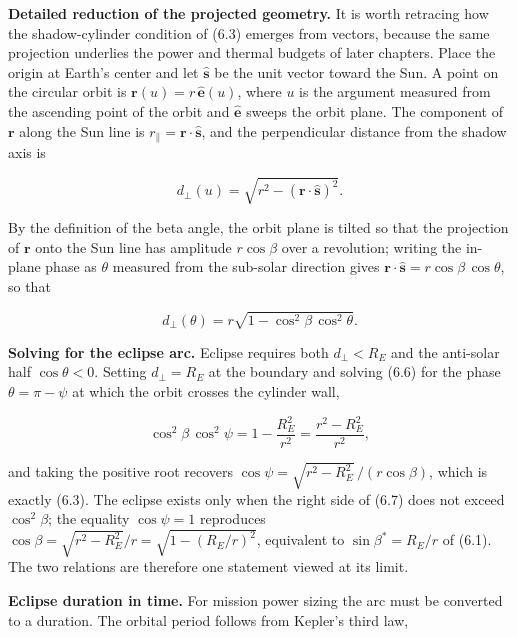 \documentclass[
  11pt,
  openany,
  oneside]{book}
\begin{document}
\textbf{Detailed reduction of the projected geometry.} It is worth
retracing how the shadow-cylinder condition of (6.3) emerges from
vectors, because the same projection underlies the power and thermal
budgets of later chapters. Place the origin at Earth's center and let
\(\hat{\mathbf{s}}\) be the unit vector toward the Sun. A point on the
circular orbit is \(\mathbf{r}(u) = r\,\hat{\mathbf{e}}(u)\), where
\(u\) is the argument measured from the ascending point of the orbit and
\(\hat{\mathbf{e}}\) sweeps the orbit plane. The component of
\(\mathbf{r}\) along the Sun line is
\(r_\parallel = \mathbf{r}\cdot\hat{\mathbf{s}}\), and the perpendicular
distance from the shadow axis is

\begin{equation}
d_\perp(u) = \sqrt{r^2 - (\mathbf{r}\cdot\hat{\mathbf{s}})^2}. \tag{6.5}
\end{equation}

By the definition of the beta angle, the orbit plane is tilted so that
the projection of \(\mathbf{r}\) onto the Sun line has amplitude
\(r\cos\beta\) over a revolution; writing the in-plane phase as
\(\theta\) measured from the sub-solar direction gives
\(\mathbf{r}\cdot\hat{\mathbf{s}} = r\cos\beta\,\cos\theta\), so that

\begin{equation}
d_\perp(\theta) = r\sqrt{1 - \cos^2\beta\,\cos^2\theta}. \tag{6.6}
\end{equation}

\textbf{Solving for the eclipse arc.} Eclipse requires both
\(d_\perp < R_E\) and the anti-solar half \(\cos\theta < 0\). Setting
\(d_\perp = R_E\) at the boundary and solving (6.6) for the phase
\(\theta = \pi - \psi\) at which the orbit crosses the cylinder wall,

\begin{equation}
\cos^2\beta\,\cos^2\psi = 1 - \frac{R_E^2}{r^2} = \frac{r^2 - R_E^2}{r^2}, \tag{6.7}
\end{equation}

and taking the positive root recovers
\(\cos\psi = \sqrt{r^2 - R_E^2}\,/(r\cos\beta)\), which is exactly
(6.3). The eclipse exists only when the right side of (6.7) does not
exceed \(\cos^2\beta\); the equality \(\cos\psi = 1\) reproduces
\(\cos\beta = \sqrt{r^2 - R_E^2}/r = \sqrt{1 - (R_E/r)^2}\), equivalent
to \(\sin\beta^\ast = R_E/r\) of (6.1). The two relations are therefore
one statement viewed at its limit.

\textbf{Eclipse duration in time.} For mission power sizing the arc must
be converted to a duration. The orbital period follows from Kepler's
third law,
\end{document}
